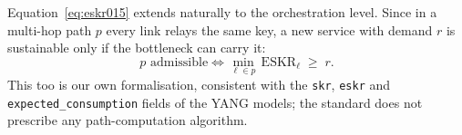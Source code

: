 Equation~\eqref{eq:eskr015} extends naturally to the orchestration level.
Since in a multi-hop path $p$ every link relays the same key, a new service
with demand $r$ is sustainable only if the bottleneck can carry it:
\begin{equation}
  p \text{ admissible} \iff
  \min_{\ell\in p}\, \mathrm{ESKR}_\ell \;\ge\; r .
  \label{eq:admissible}
\end{equation}
This too is our own formalisation, consistent with the \texttt{skr},
\texttt{eskr} and \texttt{expected\_consumption} fields of the YANG models;
the standard does not prescribe any path-computation algorithm.
